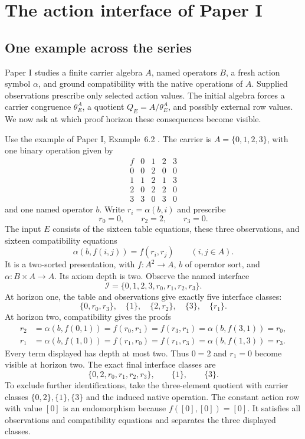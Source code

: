 \section{The action interface of Paper I}\label{sec:actionlab}

\subsection{One example across the series}
Paper I studies a finite carrier algebra $A$, named operators $B$, a fresh action symbol $\alpha$, and ground compatibility with the native operations of $A$. Supplied observations prescribe only selected action values. The initial algebra forces a carrier congruence $\theta_E^A$, a quotient $Q_E=A/\theta_E^A$, and possibly external row values. We now ask at which proof horizon these consequences become visible.

Use the example of Paper I, Example~6.2 \cite{ShcherbakovI}. The carrier is $A=\{0,1,2,3\}$, with one binary operation given by
\[
\begin{array}{c|rrrr}
f&0&1&2&3\\\hline
0&0&2&0&0\\
1&1&2&1&3\\
2&0&2&2&0\\
3&3&0&3&0
\end{array}
\]
and one named operator $b$. Write $r_i=\alpha(b,i)$ and prescribe
\[
r_0=0,\qquad r_2=2,\qquad r_3=0.
\]
The input $E$ consists of the sixteen table equations, these three observations, and sixteen compatibility equations
\[
\alpha(b,f(i,j))=f(r_i,r_j)\qquad(i,j\in A).
\]
It is a two-sorted presentation, with $f:A^2\to A$, $b$ of operator sort, and $\alpha:B\times A\to A$. Its axiom depth is two. Observe the named interface
\[
\mathcal I=\{0,1,2,3,r_0,r_1,r_2,r_3\}.
\]
At horizon one, the table and observations give exactly five interface classes:
\[
\{0,r_0,r_3\},\quad \{1\},\quad \{2,r_2\},\quad \{3\},\quad \{r_1\}.
\]
At horizon two, compatibility gives the proofs
\begin{align*}
r_2&=\alpha(b,f(0,1))=f(r_0,r_1)
=f(r_3,r_1)=\alpha(b,f(3,1))=r_0,\\
r_1&=\alpha(b,f(1,0))=f(r_1,r_0)
=f(r_1,r_3)=\alpha(b,f(1,3))=r_3.
\end{align*}
Every term displayed has depth at most two. Thus $0=2$ and $r_1=0$ become visible at horizon two. The exact final interface classes are
\[
\{0,2,r_0,r_1,r_2,r_3\},\qquad\{1\},\qquad\{3\}.
\]
To exclude further identifications, take the three-element quotient with carrier classes $\{0,2\},\{1\},\{3\}$ and the induced native operation. The constant action row with value $[0]$ is an endomorphism because $f([0],[0])=[0]$. It satisfies all observations and compatibility equations and separates the three displayed classes.

